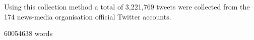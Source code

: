 Using this collection method a total of 3,221,769 tweets were collected from the 174 news-media organisation official Twitter accounts. 




60054638 words









